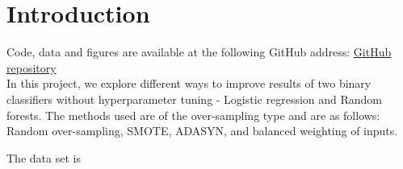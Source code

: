 \section{Introduction}
Code, data and figures are available at the following GitHub address:
\href{https://github.com/geirtul/fys-stk4155/tree/master/project3}{GitHub repository}\\

In this project, we explore different ways to improve results of two binary
classifiers without hyperparameter tuning - Logistic regression and
Random forests. The methods used are of the over-sampling type and are as
follows: Random over-sampling, SMOTE, ADASYN, and balanced weighting of
inputs.

The data set is





